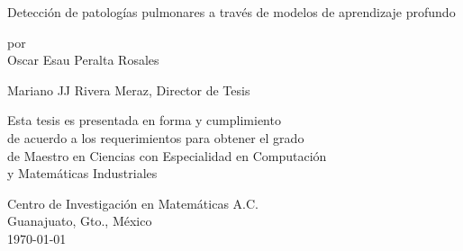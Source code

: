 \documentclass[12pt, oneside]{book}
\begin{document}
\begin{titlepage}
\begin{center}

\vspace*{2cm}

{\huge Detección de patologías pulmonares a través de modelos de aprendizaje profundo} %

\vspace{2cm}

{\large por\\Oscar Esau Peralta Rosales}

\vspace{2cm}
{Mariano JJ Rivera Meraz, Director de Tesis}

\vfill

Esta tesis es presentada en forma y cumplimiento\\
de acuerdo a los requerimientos para obtener el grado\\
de Maestro en Ciencias con Especialidad en Computación\\
y Matemáticas Industriales\\
\vspace*{3cm}

Centro de Investigación en Matemáticas A.C. \\
Guanajuato, Gto., México\\
\today %
\end{center}
\end{titlepage}

\frontmatter


\end{document}
